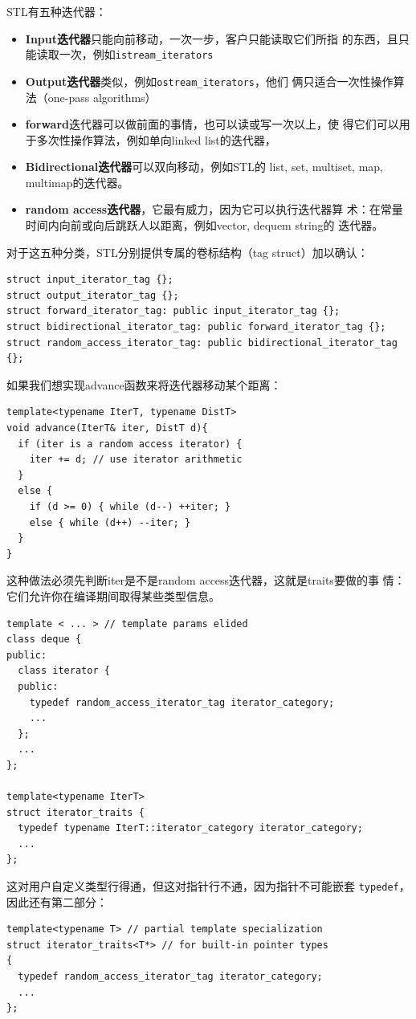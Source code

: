 STL有五种迭代器：
\begin{itemize}
\item \textbf{Input迭代器}只能向前移动，一次一步，客户只能读取它们所指
  的东西，且只能读取一次，例如\texttt{istream\_iterators}
\item \textbf{Output迭代器}类似，例如\texttt{ostream\_iterators}，他们
  俩只适合一次性操作算法（one-pass algorithms）
\item \textbf{forward}迭代器可以做前面的事情，也可以读或写一次以上，使
  得它们可以用于多次性操作算法，例如单向linked list的迭代器，
\item \textbf{Bidirectional迭代器}可以双向移动，例如STL的
  list, set, multiset, map, multimap的迭代器。
\item \textbf{random access迭代器}，它最有威力，因为它可以执行迭代器算
  术：在常量时间内向前或向后跳跃人以距离，例如vector, dequem string的
  迭代器。
\end{itemize}
对于这五种分类，STL分别提供专属的卷标结构（tag struct）加以确认：
\begin{verbatim}
struct input_iterator_tag {};
struct output_iterator_tag {};
struct forward_iterator_tag: public input_iterator_tag {};
struct bidirectional_iterator_tag: public forward_iterator_tag {};
struct random_access_iterator_tag: public bidirectional_iterator_tag {};
\end{verbatim}

如果我们想实现advance函数来将迭代器移动某个距离：
\begin{verbatim}
template<typename IterT, typename DistT>
void advance(IterT& iter, DistT d){
  if (iter is a random access iterator) {
    iter += d; // use iterator arithmetic
  }
  else {
    if (d >= 0) { while (d--) ++iter; }
    else { while (d++) --iter; }
  }
}
\end{verbatim}
这种做法必须先判断iter是不是random access迭代器，这就是traits要做的事
情：它们允许你在编译期间取得某些类型信息。

\begin{verbatim}
template < ... > // template params elided
class deque {
public:
  class iterator {
  public:
    typedef random_access_iterator_tag iterator_category;
    ...
  };
  ...
};

template<typename IterT>
struct iterator_traits {
  typedef typename IterT::iterator_category iterator_category;
  ...
};
\end{verbatim}
这对用户自定义类型行得通，但这对指针行不通，因为指针不可能嵌套
\texttt{typedef}，因此还有第二部分：
\begin{verbatim}
template<typename T> // partial template specialization
struct iterator_traits<T*> // for built-in pointer types
{
  typedef random_access_iterator_tag iterator_category;
  ...
};
\end{verbatim}

